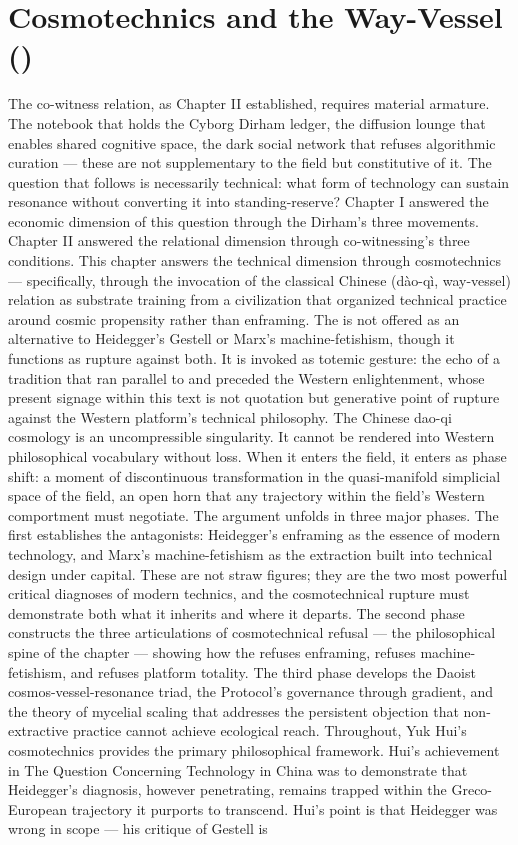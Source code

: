 \chapter{Cosmotechnics and the Way-Vessel ()}
\label{ch:04}



The co-witness relation, as Chapter II established, requires material armature. The notebook that holds the Cyborg Dirham ledger, the diffusion lounge that enables shared cognitive space, the dark social network that refuses algorithmic curation — these are not supplementary to the field but constitutive of it. The question that follows is necessarily technical: what form of technology can sustain resonance without converting it into standing-reserve? Chapter I answered the economic dimension of this question through the Dirham’s three movements. Chapter II answered the relational dimension through co-witnessing’s three conditions. This chapter answers the technical dimension through cosmotechnics — specifically, through the invocation of the classical Chinese  (dào-qì, way-vessel) relation as substrate training from a civilization that organized technical practice around cosmic propensity rather than enframing. The  is not offered as an alternative to Heidegger’s Gestell or Marx’s machine-fetishism, though it functions as rupture against both. It is invoked as totemic gesture: the echo of a tradition that ran parallel to and preceded the Western enlightenment, whose present signage within this text is not quotation but generative point of rupture against the Western platform’s technical philosophy. The Chinese dao-qi cosmology is an uncompressible singularity. It cannot be rendered into Western philosophical vocabulary without loss. When it enters the field, it enters as phase shift: a moment of discontinuous transformation in the quasi-manifold simplicial space of the field, an open horn that any trajectory within the field’s Western comportment must negotiate. The argument unfolds in three major phases. The first establishes the antagonists: Heidegger’s enframing as the essence of modern technology, and Marx’s machine-fetishism as the extraction built into technical design under capital. These are not straw figures; they are the two most powerful critical diagnoses of modern technics, and the cosmotechnical rupture must demonstrate both what it inherits and where it departs. The second phase constructs the three articulations of cosmotechnical refusal — the philosophical spine of the chapter — showing how the  refuses enframing, refuses machine-fetishism, and refuses platform totality. The third phase develops the Daoist cosmos-vessel-resonance triad, the   Protocol’s governance through gradient, and the theory of mycelial scaling that addresses the persistent objection that non-extractive practice cannot achieve ecological reach. Throughout, Yuk Hui’s cosmotechnics provides the primary philosophical framework. Hui’s achievement in The Question Concerning Technology in China was to demonstrate that Heidegger’s diagnosis, however penetrating, remains trapped within the Greco-European trajectory it purports to transcend. Hui’s point is that Heidegger was wrong in scope — his critique of Gestell is 